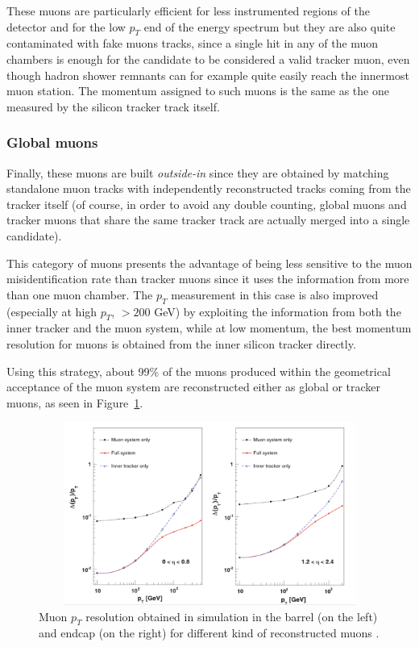 \documentclass[a4paper, 10pt, openright]{report}
\begin{document}
These muons are particularly efficient for less instrumented regions of the detector and for the low $p_T$ end of the energy spectrum but they are also quite contaminated with fake muons tracks, since a single hit in any of the muon chambers is enough for the candidate to be considered a valid tracker muon, even though hadron shower remnants can for example quite easily reach the innermost muon station. The momentum assigned to such muons is the same as the one measured by the silicon tracker track itself.

\subsubsection*{Global muons}
Finally, these muons are built \textit{outside-in} since they are obtained by matching standalone muon tracks with independently reconstructed tracks coming from the tracker itself (of course, in order to avoid any double counting, global muons and tracker muons that share the same tracker track are actually merged into a single candidate). 

This category of muons presents the advantage of being less sensitive to the muon misidentification rate than tracker muons since it uses the information from more than one muon chamber. The $p_T$ measurement in this case is also improved (especially at high $p_T$, $> 200$ GeV) by exploiting the information from both the inner tracker and the muon system, while at low momentum, the best momentum resolution for muons is obtained from the inner silicon tracker directly.

Using this strategy, about 99\% of the muons produced within the geometrical acceptance of the muon system are reconstructed either as global or tracker muons, as seen in Figure~\ref{fig:MuonEff}.

\begin{figure}[htbp]
\begin{center}
\includegraphics[width=13cm, height=6cm]{figs/MuonEff.png}
\caption{Muon $p_T$ resolution obtained in simulation in the barrel (on the left) and endcap (on the right) for different kind of reconstructed muons \cite{Quarkonium}.}
\label{fig:MuonEff}
\end{center}
\end{figure}
\end{document}
